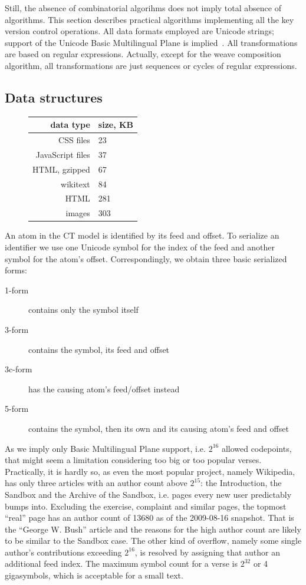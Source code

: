 \documentclass{acm_proc_article-sp}
\begin{document}
Still, the absence of combinatorial algorihms does not imply total absence of algorithms. This section describes practical algorithms implementing all the key version control operations.
All data formats employed are Unicode strings; support of the Unicode Basic Multilingual Plane is implied~\cite{unicode}. All transformations are based on regular expressions. Actually, except for the weave composition algorithm, all transformations are just sequences or cycles of regular expressions.

\subsection{Data structures}
\begin{figure}
\begin{tabular}{r|l}
data type & size, KB \\
\hline
CSS files & 23 \\
JavaScript files & 37 \\
HTML, gzipped & 67 \\
wikitext & 84 \\
HTML & 281 \\
images & 303 
\end{tabular}
\end{figure}
An atom in the CT model is identified by its feed and offset. To serialize an identifier we use one Unicode symbol for the index of the feed and another symbol for the atom's offset.
Correspondingly, we obtain three basic serialized forms:
\begin{description}
\item[1-form] contains only the symbol itself
\item[3-form] contains the symbol, its feed and offset
\item[3c-form] has the causing atom's feed/offset instead
\item[5-form] contains the symbol, then its own and its causing atom's feed and offset
\end{description}
As we imply only Basic Multilingual Plane support, i.e. $2^{16}$ allowed codepoints, that might seem a limitation considering too big or too popular verses. Practically, it is hardly so, as even the most popular project, namely Wikipedia, has only three articles with an author count above $2^{15}$: the Introduction, the Sandbox and the Archive of the Sandbox, i.e. pages every new user predictably bumps into. Excluding the exercise, complaint and similar pages, the topmost ``real'' page has an author count of 13680 as of the 2009-08-16 snapshot. That is the ``George W. Bush'' article and the reasons for the high author count are likely to be similar to the Sandbox case.
The other kind of overflow, namely some single author's contributions exceeding $2^{16}$, is resolved by assigning that author an additional feed index. The maximum symbol count for a verse is $2^{32}$ or 4 gigasymbols, which is acceptable for a small text.
\end{document}
